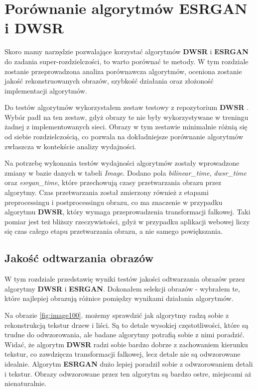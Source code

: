 \chapter{Porównanie algorytmów ESRGAN i DWSR} \label{chap:porownanie_algorytmow}

Skoro mamy narzędzie pozwalające korzystać algorytmów \textbf{DWSR} \cite{guo2017deep} i \textbf{ESRGAN} \cite{wang2018esrgan} do zadania super-rozdzielczości, to warto porównać te metody. W tym rozdziale zostanie przeprowadzona analiza porównawcza algorytmów, oceniona zostanie jakość rekonstruowanych obrazów, szybkość działania oraz złożoność implementacji algorytmów.

Do testów algorytmów wykorzystałem zestaw testowy z repozytorium \textbf{DWSR} \cite{guo2017deep}. Wybór padł na ten zestaw, gdyż obrazy te nie były wykorzystywane w treningu żadnej z implementowanych sieci. Obrazy w tym zestawie minimalnie różnią się od siebie rozdzielczością, co pozwala na dokładniejsze porównanie algorytmów zwłaszcza w kontekście analizy wydajności.

Na potrzebę wykonania testów wydajności algorytmów zostały wprowadzone zmiany w bazie danych w tabeli \textit{Image}. Dodano pola \textit{bilinear\_time}, \textit{dwsr\_time} oraz \textit{esrgan\_time}, które przechowują czasy przetwarzania obrazu przez algorytmy. Czas przetwarzania został zmierzony również z etapami preprocessingu i postprocessingu obrazu, co ma znaczenie w przypadku algorytmu \textbf{DWSR}, który wymaga przeprowadzenia transformacji falkowej. Taki pomiar jest też bliższy rzeczywistości, gdyż w przypadku aplikacji webowej liczy się czas całego etapu przetwarzania obrazu, a nie samego powiększania.

\section{Jakość odtwarzania obrazów}

W tym rozdziale przedstawię wyniki testów jakości odtwarzania obrazów przez algorytmy \textbf{DWSR} i \textbf{ESRGAN}.
Dokonałem selekcji obrazów - wybrałem te, które najlepiej obrazują różnice pomiędzy wynikami działania algorytmów.


Na obrazie \ref{fig:image100}. możemy sprawdzić jak algorytmy radzą sobie z rekonstrukcją tekstur drzew i liści. Są to detale wysokiej częstotliwości, które są trudne do odwzorowania, ale badane algorytmy potrafią sobie z nimi poradzić.
Widać, że algorytm \textbf{DWSR} radzi sobie bardzo dobrze z zachowaniem kierunku tekstur, co zawdzięcza transformacji falkowej, lecz detale nie są odwzorowane idealnie. Algorytm \textbf{ESRGAN} dużo lepiej poradził sobie z odwzorowaniem detali i tekstur. Obrazy odwzorowane przez ten algorytm są bardzo ostre, miejscami aż nienaturalnie. 


